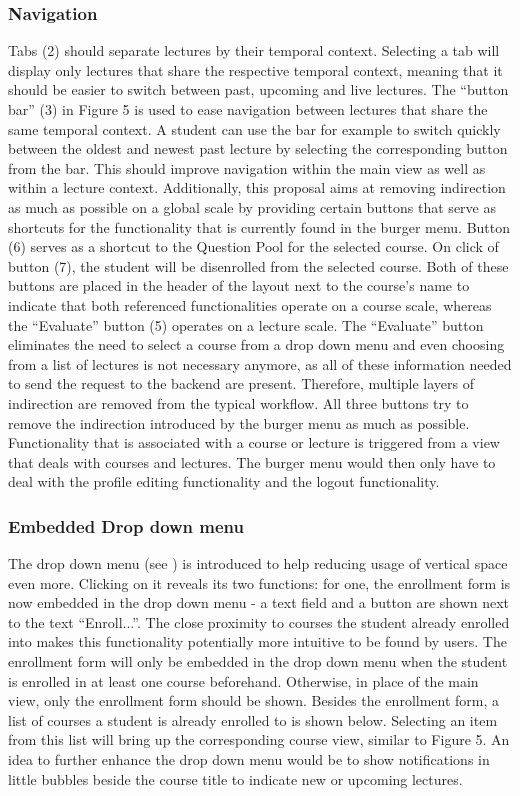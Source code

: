 \subsubsection{Navigation}
Tabs (2) should separate lectures by their temporal context. Selecting a tab will display only lectures that share the respective temporal context, meaning that it should be easier to switch between past, upcoming and live lectures.
The “button bar” (3) in Figure 5 is used to ease navigation between lectures that share the same temporal context. A student can use the bar for example to switch quickly between the oldest and newest past lecture by selecting the corresponding button from the bar. This should improve navigation within the main view as well as within a lecture context. 
Additionally, this proposal aims at removing indirection as much as possible on a global scale by providing certain buttons that serve as shortcuts for the functionality that is currently found in the burger menu. Button (6) serves as a shortcut to the Question Pool for the selected course. On click of button (7), the student will be disenrolled from the selected course. Both of these buttons are placed in the header of the layout next to the course’s name to indicate that both referenced functionalities operate on a course scale, whereas the “Evaluate” button (5) operates on a lecture scale. The “Evaluate” button eliminates the need to select a course from a drop down menu and even choosing from a list of lectures is not necessary anymore, as all of these information needed to send the request to the backend are present. Therefore, multiple layers of indirection are removed from the typical workflow. All three buttons try to remove the indirection introduced by the burger menu as much as possible. Functionality that is associated with a course or lecture is triggered from a view that deals with courses and lectures. The burger menu would then only have to deal with the profile editing functionality and the logout functionality.

\subsubsection{Embedded Drop down menu}
The drop down menu (see \todogrf) is introduced to help reducing usage of vertical space even more. Clicking on it reveals its two functions: for one, the enrollment form is now embedded in the drop down menu - a text field and a button are shown next to the text “Enroll...”. The close proximity to courses the student already enrolled into makes this functionality potentially more intuitive to be found by users. The enrollment form will only be embedded in the drop down menu when the student is enrolled in at least one course beforehand. Otherwise, in place of the main view, only the enrollment form should be shown. Besides the enrollment form, a list of courses a student is already enrolled to is shown below. Selecting an item from this list will bring up the corresponding course view, similar to Figure 5. An idea to further enhance the drop down menu would be to show notifications in little bubbles beside the course title to indicate new or upcoming lectures.


